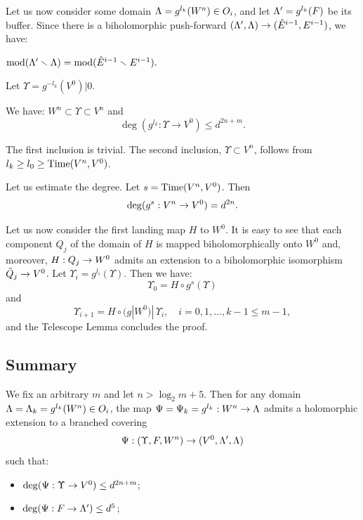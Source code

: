 Let us now consider some domain ${\Lambda}= g^{l_k}(W^n)\in O_i$, and let ${\Lambda}' = g^{l_k} (F)$ be its  buffer.
Since there is a biholomorphic push-forward $({\Lambda}', {\Lambda})\rightarrow ( \hat E^{i-1}, E^{i-1} )$, we have:

\begin{lem}\label{moduli of buffers}
   $ \operatorname{mod}({\Lambda}'\smallsetminus {\Lambda}) = \operatorname{mod} (\hat E^{i-1}\smallsetminus  E^{i-1}).$
\end{lem} 
  
Let $\Upsilon= g^{-l_k}(V^0)|0$.

\begin{lem}\label{outer degree}
  We have: $W^n\subset \Upsilon \subset V^n$ and 
$$
   \deg(g^{l_k}: \Upsilon\to V^0) \leq d^{2n+m}.
$$
\end{lem}

\begin{pf}
  The first inclusion is trivial. The  second inclusion, $\Upsilon\subset V^n$,
follows from  $l_k\geq l_0\geq \operatorname{Time}(V^n, V^0)$. 

Let us estimate the degree. Let $s= \operatorname{Time}(V^n,V^0)$. 
Then  
$$
     \deg(g^s : V^n \rightarrow V^0)=d^{2n}. 
$$

Let us now consider the first landing map $H$ to $W^0$.
It is easy to see that each component $Q_j$ of the domain of $H$ 
is mapped biholomorphically onto  $W^0$ and, moreover,
 $H:  Q_j\rightarrow W^0$  admits an extension
to a biholomorphic isomorphism $\tilde Q_j\rightarrow V^0$. 
Let $\Upsilon_i = g^{l_i}(\Upsilon) $.  Then we have:
$$
  \Upsilon_0  =       H \circ g^s (\Upsilon)
$$
and 
$$
     \Upsilon_{i+1} = H\circ (g | W^0)|\,  \Upsilon_i , \quad i=0,1,\dots, k-1 \leq m-1, 
$$
and the Telescope Lemma concludes the proof. 
\end{pf}

\subsection{Summary}\label{summary} 
We fix an arbitrary $m$ and let $n>\log_2 m +5$. 
Then for any domain ${\Lambda} ={\Lambda}_k = g^{l_k}(W^n) \in O_i$, 
the map $\Psi=\Psi_k= g^{l_k}: W^n \rightarrow {\Lambda}$ admits a holomorphic extension to a branched covering
\begin{equation}\label{3 domains}
    \Psi: (\Upsilon, F, W^n) \rightarrow (V^0, {\Lambda}', {\Lambda})
\end{equation}
such that:

\begin{itemize}

\item [(P1)] $\deg(\Psi: \Upsilon\rightarrow V^0)\leq d^{2n+m}$;

\item[(P2)] $\deg(\Psi: F\rightarrow {\Lambda}')\leq d^5$;

\end{itemize}

